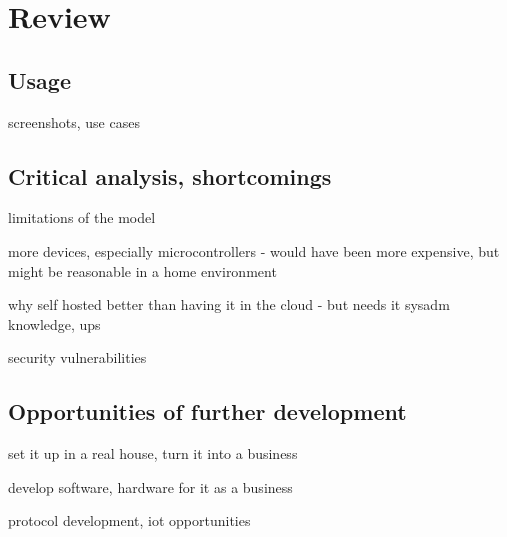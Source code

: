 \chapter{Review} %
\section{Usage}
screenshots, use cases
\section{Critical analysis, shortcomings}
limitations of the model

more devices, especially microcontrollers - would have been more expensive, but might be reasonable in a home environment

why self hosted better than having it in the cloud - but needs it sysadm knowledge, ups

security vulnerabilities
\section{Opportunities of further development}
set it up in a real house, turn it into a business

develop software, hardware for it as a business

protocol development, iot opportunities
